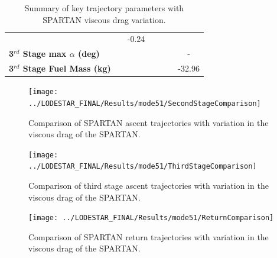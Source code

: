 \begin{table}[ht]
\begin{tabular}{l c c c c c c}
		& \thirdqOverFivevCdOneHundredFifteen
		&-0.24
		\\
		\textbf{3$^{rd}$ Stage max $\alpha$ (deg)}
		& \thirdmaxAoAvCdTwenty
		& \thirdmaxAoAvCdFifty
		& \thirdmaxAoAvCdStandard
		& \thirdmaxAoAvCdOneHundredSeven
		& \thirdmaxAoAvCdOneHundredFifteen
		& -
		\\
		\textbf{3$^{rd}$ Stage Fuel Mass (kg)}
		& \thirdmFuelvCdTwenty
		& \thirdmFuelvCdFifty
		& \thirdmFuelvCdStandard
		& \thirdmFuelvCdOneHundredSeven
		& \thirdmFuelvCdOneHundredFifteen
		&-32.96
		\\
		\hline 
	\end{tabular} 
	\caption{Summary of key trajectory parameters with SPARTAN viscous drag variation.}
	\label{tab:viscous}
\end{table} 


\begin{figure}[!th]
\centering
\texttt{[image: ../LODESTAR\_FINAL/Results/mode51/SecondStageComparison]}
\caption{Comparison of SPARTAN ascent trajectories with variation in the viscous drag of the SPARTAN.}
\label{fig:SecondStageComparison-}
\end{figure}
\begin{figure}[!th]
\centering
\texttt{[image: ../LODESTAR\_FINAL/Results/mode51/ThirdStageComparison]}
\caption{Comparison of third stage ascent trajectories with variation in the viscous drag of the SPARTAN.}
\label{fig:ThirdStageComparison-}
\end{figure}


\begin{figure}[!th]
	\centering
	\texttt{[image: ../LODESTAR\_FINAL/Results/mode51/ReturnComparison]}
	\caption{Comparison of SPARTAN return trajectories with variation in the viscous drag of the SPARTAN.}
	\label{fig:ReturnComparison-}
\end{figure}

